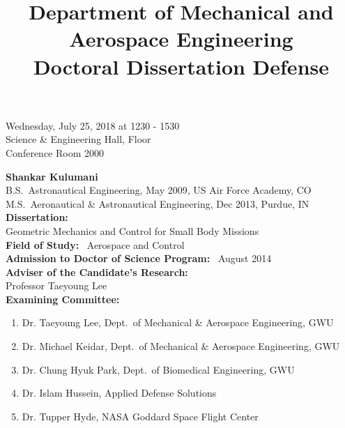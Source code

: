 \documentclass[letterpaper]{article}
\title{Department of Mechanical and Aerospace Engineering\\
Doctoral Dissertation Defense}
\date{}
\begin{document}
\maketitle
\thispagestyle{empty}

\begin{flushright}
    Wednesday, July 25, 2018 at 1230 - 1530\\
    Science \& Engineering Hall,  Floor\\
    Conference Room 2000
\end{flushright}

\noindent \textbf{Shankar Kulumani}\\

\noindent B.S.\ Astronautical Engineering, May 2009, US Air Force Academy, CO\\
\noindent M.S.\ Aeronautical \& Astronautical Engineering, Dec 2013, Purdue, IN\\

\noindent \textbf{Dissertation:}\\

\noindent Geometric Mechanics and Control for Small Body Missions\\

\noindent \textbf{Field of Study:} \, Aerospace and Control\\

\noindent \textbf{Admission to Doctor of Science Program:} \, August 2014\\

\noindent \textbf{Adviser of the Candidate's Research:}\\

Professor Taeyoung Lee\\

\noindent \textbf{Examining Committee:}

\begin{enumerate}
    \item Dr. Taeyoung Lee, Dept.\ of Mechanical \& Aerospace Engineering, GWU
    \item Dr. Michael Keidar, Dept.\ of Mechanical \& Aerospace Engineering, GWU
    \item Dr. Chung Hyuk Park, Dept.\ of Biomedical Engineering, GWU
    \item Dr. Islam Hussein, Applied Defense Solutions
    \item Dr. Tupper Hyde, NASA Goddard Space Flight Center
\end{enumerate}
\end{document}
